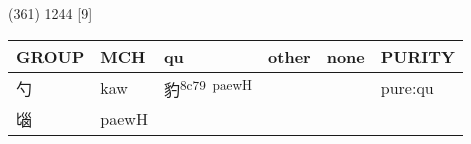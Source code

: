 \documentclass[14pt,a4paper]{scrartcl}
\begin{document}
(361) 1244 {[}9{]}

\begin{longtable}[c]{@{}llllll@{}}
\toprule
\begin{minipage}[b]{0.14\columnwidth}\raggedright\strut
GROUP
\strut\end{minipage} &
\begin{minipage}[b]{0.14\columnwidth}\raggedright\strut
MCH
\strut\end{minipage} &
\begin{minipage}[b]{0.14\columnwidth}\raggedright\strut
qu
\strut\end{minipage} &
\begin{minipage}[b]{0.14\columnwidth}\raggedright\strut
other
\strut\end{minipage} &
\begin{minipage}[b]{0.14\columnwidth}\raggedright\strut
none
\strut\end{minipage} &
\begin{minipage}[b]{0.14\columnwidth}\raggedright\strut
PURITY
\strut\end{minipage}\tabularnewline
\midrule
\endhead
\begin{minipage}[t]{0.14\columnwidth}\raggedright\strut
勺
\strut\end{minipage} &
\begin{minipage}[t]{0.14\columnwidth}\raggedright\strut
kaw
\strut\end{minipage} &
\begin{minipage}[t]{0.14\columnwidth}\raggedright\strut
豹\textsuperscript{8c79~paewH}
\strut\end{minipage} &
\begin{minipage}[t]{0.14\columnwidth}\raggedright\strut
\strut\end{minipage} &
\begin{minipage}[t]{0.14\columnwidth}\raggedright\strut
\strut\end{minipage} &
\begin{minipage}[t]{0.14\columnwidth}\raggedright\strut
pure:qu
\strut\end{minipage}\tabularnewline
\begin{minipage}[t]{0.14\columnwidth}\raggedright\strut
匘
\strut\end{minipage} &
\begin{minipage}[t]{0.14\columnwidth}\raggedright\strut
paewH
\strut\end{minipage} &
\begin{minipage}[t]{0.14\columnwidth}\raggedright\strut
\strut\end{minipage} &

\end{longtable}
\end{document}
